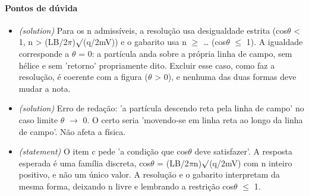 \documentclass{article}%
\begin{document}
\paragraph{Pontos de dúvida}%
\begin{itemize}%
\item%
\textit{(solution)} Para os n admissíveis, a resolução usa desigualdade estrita (cos$\theta$ < 1, n > (LB/2$\pi$)$\surd$(q/2mV)) e o gabarito usa n $\geq$ \ldots{} (cos$\theta$ $\leq$ 1). A igualdade corresponde a $\theta$ = 0: a partícula anda sobre a própria linha de campo, sem hélice e sem 'retorno' propriamente dito. Excluir esse caso, como faz a resolução, é coerente com a figura ($\theta$ > 0), e nenhuma das duas formas deve mudar a nota.%
\item%
\textit{(solution)} Erro de redação: 'a partícula descendo reta pela linha de campo' no caso limite $\theta$ $\to$ 0. O certo seria 'movendo{-}se em linha reta ao longo da linha de campo'. Não afeta a física.%
\item%
\textit{(statement)} O item c pede 'a condição que cos$\theta$ deve satisfazer'. A resposta esperada é uma família discreta, cos$\theta$ = (LB/2$\pi$n)$\surd$(q/2mV) com n inteiro positivo, e não um único valor. A resolução e o gabarito interpretam da mesma forma, deixando n livre e lembrando a restrição cos$\theta$ $\leq$ 1.%
\end{itemize}%
\end{document}
